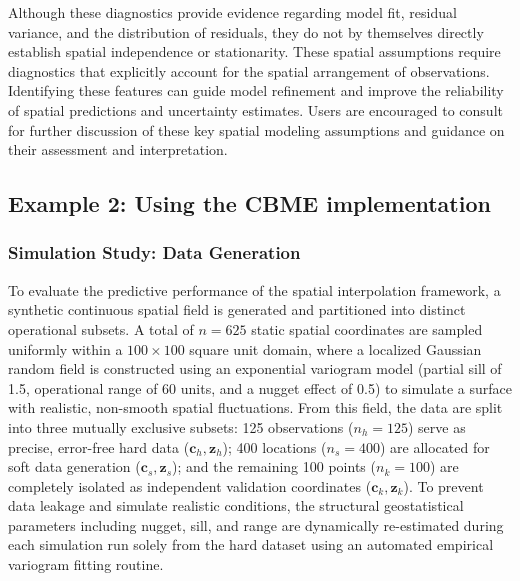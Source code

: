 Although these diagnostics provide evidence regarding model fit, residual variance, and the distribution of residuals, they do not by themselves directly establish spatial independence or stationarity. These spatial assumptions require diagnostics that explicitly account for the spatial arrangement of observations. Identifying these features can guide model refinement and improve the reliability of spatial predictions and uncertainty estimates. Users are encouraged to consult \citep{wackernagel2003multivariate, banerjee2014hierarchical} for further discussion of these key spatial modeling assumptions and guidance on their assessment and interpretation.

\subsection{Example 2: Using the CBME implementation}\label{example-2-using-the-cbme-implementation}

\subsubsection{Simulation Study: Data Generation}\label{simulation-study-data-generation}

To evaluate the predictive performance of the spatial interpolation framework, a synthetic continuous spatial field is generated and partitioned into distinct operational subsets. A total of \(n = 625\) static spatial coordinates are sampled uniformly within a \(100 \times 100\) square unit domain, where a localized Gaussian random field is constructed using an exponential variogram model (partial sill of 1.5, operational range of 60 units, and a nugget effect of 0.5) to simulate a surface with realistic, non-smooth spatial fluctuations. From this field, the data are split into three mutually exclusive subsets: 125 observations (\(n_h = 125\)) serve as precise, error-free hard data (\(\mathbf{c}_h, \mathbf{z}_h\)); 400 locations (\(n_s = 400\)) are allocated for soft data generation (\(\mathbf{c}_s, \mathbf{z}_s\)); and the remaining 100 points (\(n_k = 100\)) are completely isolated as independent validation coordinates (\(\mathbf{c}_k, \mathbf{z}_k\)). To prevent data leakage and simulate realistic conditions, the structural geostatistical parameters including nugget, sill, and range are dynamically re-estimated during each simulation run solely from the hard dataset using an automated empirical variogram fitting routine.

